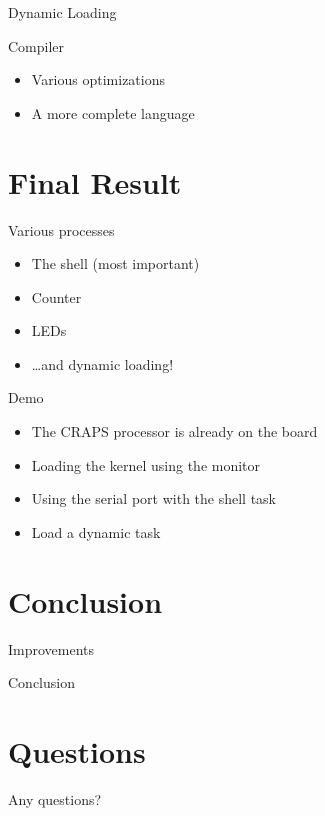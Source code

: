 \documentclass{beamer}
\begin{document}
      \begin{frame}{Dynamic Loading}
      \end{frame}

      \begin{frame}{Compiler}
        \begin{itemize}
          \item Various optimizations
          \item A more complete language
        \end{itemize}
      \end{frame}

  \section{Final Result}
    \begin{frame}{Various processes}
      \begin{itemize}
        \item The shell (most important)
        \item Counter
        \item LEDs
        \item \dots and dynamic loading!
      \end{itemize}
    \end{frame}

    \begin{frame}{Demo}
      \begin{itemize}
        \item The CRAPS processor is already on the board
        \pause
        \item Loading the kernel using the monitor
      \end{itemize}
      \begin{figure}
        \centering
      \end{figure}
      \pause
      \begin{itemize}
        \item Using the serial port with the shell task
        \pause
        \item Load a dynamic task
      \end{itemize}
    \end{frame}

  \section{Conclusion}
    \begin{frame}{Improvements}
    \end{frame}

    \begin{frame}{Conclusion}
    \end{frame}

  \section{Questions}
    \begin{frame}
      Any questions?
    \end{frame}
\end{document}
